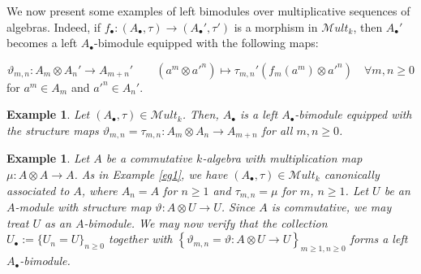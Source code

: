 \documentclass[10pt, colorlinks]{article}
\numberwithin{equation}{section} \DeclareMathSizes{2}{10}{12}{13}
\newtheorem{eg}[thm]{Example}
\begin{document}
     
      We now present some examples of left bimodules over multiplicative sequences of algebras. Indeed, if $f_\bullet:(A_\bullet,\tau)\longrightarrow (A_\bullet',\tau')$ is a morphism in $\mathscr Mult_k$, then $A_\bullet'$  becomes a left $A_\bullet$-bimodule equipped with the following maps:

     \begin{equation}
         \vartheta_{m,n}:A_m\otimes A_n'\longrightarrow A_{m+n}'\qquad(a^m\otimes {a'}^n)\mapsto \tau_{m,n}'(f_m(a^m)\otimes {a'}^n)\quad \forall m,n\geq 0
     \end{equation}
    for $a^m\in A_m$ and ${a'}^n\in A_n'$.



    \begin{eg}
      \emph{  Let $(A_\bullet,\tau)\in\mathscr Mult_k$. Then, $A_\bullet$ is a left $A_\bullet$-bimodule equipped with the structure maps $\vartheta_{m,n}=\tau_{m,n}:A_m\otimes A_n\longrightarrow A_{m+n}$ for all $m,n\geq 0$. }
    \end{eg}




     \begin{eg}
        \emph{ Let $A$ be a commutative $k$-algebra with multiplication map $\mu:A\otimes A\longrightarrow A$. As in Example \ref{eg1}, we have $(A_\bullet,\tau)\in \mathscr{M}ult_k$ canonically associated to $A$, where $A_n=A$ for $n\geq 1$ and $\tau_{m,n}=\mu$ for $m$, $n\geq 1$. Let $U$ be an $A$-module with structure map $\vartheta: A\otimes U\longrightarrow  U$. Since $A$ is commutative, we may treat $U$ as an $A$-bimodule.   We may now verify that the collection $U_\bullet:=\{U_n=U\}_{n\geq 0}$ together with  $\left\{\vartheta_{m,n}=\vartheta: A\otimes U\longrightarrow U\right\}_{m\geq 1,n\geq 0}$ forms a left $A_\bullet$-bimodule.}
     \end{eg}
\end{document}
